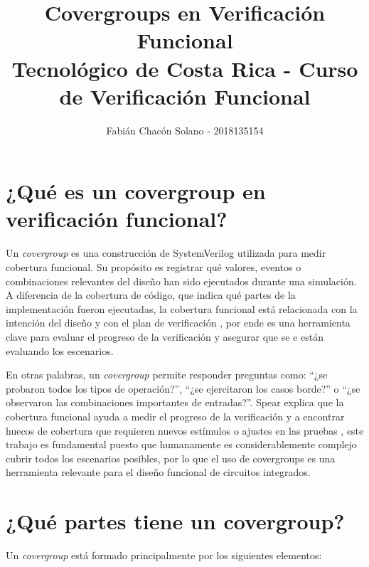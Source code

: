 ﻿\documentclass[conference]{IEEEtran}
\begin{document}
\title{Covergroups en Verificación Funcional\\ \large Tecnológico de Costa Rica - Curso de Verificación Funcional}
\author{Fabián Chacón Solano - 2018135154}
\maketitle

\section{¿Qué es un covergroup en verificación funcional?}

Un \textit{covergroup} es una construcción de SystemVerilog utilizada para
medir cobertura funcional. Su propósito es registrar qué valores, eventos o
combinaciones relevantes del diseño han sido ejecutados durante una
simulación. A diferencia de la cobertura de código, que indica qué partes de la
implementación fueron ejecutadas, la cobertura funcional está relacionada con
la intención del diseño y con el plan de verificación \cite{Spear2008}, por ende
es una herramienta clave para evaluar el progreso de la verificación y asegurar que se e
están evaluando los escenarios.

En otras palabras, un \textit{covergroup} permite responder preguntas como:
``¿se probaron todos los tipos de operación?'', ``¿se ejercitaron los casos
borde?'' o ``¿se observaron las combinaciones importantes de entradas?''.
Spear explica que la cobertura funcional ayuda a medir el progreso de la
verificación y a encontrar huecos de cobertura que requieren nuevos estímulos
o ajustes en las pruebas \cite{Spear2008}, este trabajo es fundamental
puesto que humanamente es considerablemente complejo cubrir todos los
escenarios posibles, por lo que el uso de covergroups es una herramienta relevante
para el diseño funcional de circuitos integrados.

\section{¿Qué partes tiene un covergroup?}

Un \textit{covergroup} está formado principalmente por los siguientes elementos:
\end{document}
